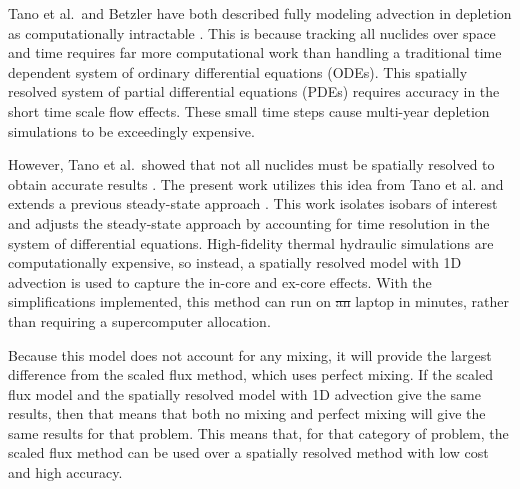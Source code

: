 \documentclass{style/nseJournal}
\providecommand{\DIFadd}[1]{{\protect\color{blue}\uwave{#1}}} %
\providecommand{\DIFdel}[1]{{\protect\color{red}\sout{#1}}}                      %
\providecommand{\DIFaddbegin}{} %
\providecommand{\DIFaddend}{} %
\providecommand{\DIFdelbegin}{} %
\providecommand{\DIFdelend}{} %
\begin{document}
Tano et al.\ and Betzler have both described fully modeling advection in depletion as computationally intractable \cite{tanocoupled2023, betzler_liquid-fueled_2021}.
This is because tracking all nuclides over space and time requires far more computational work than handling a traditional time dependent system of ordinary differential equations (ODEs).
This spatially resolved system of partial differential equations (PDEs) requires accuracy in the short time scale flow effects.
These small time steps cause multi-year depletion simulations to be exceedingly expensive.



However, Tano et al.\ showed that not all nuclides must be spatially resolved to obtain accurate results \cite{tanocoupled2023}.
The present work utilizes this idea from Tano et al. and extends a previous steady-state approach \cite{shahbazi_steady-state_2022}.
This work isolates isobars of interest and adjusts the steady-state approach by accounting for time resolution in the system of differential equations.
High-fidelity thermal hydraulic simulations are computationally expensive, so instead, a spatially resolved model with 1D advection is used to capture the in-core and ex-core effects.
With the simplifications implemented, this method can run on \DIFdelbegin \DIFdel{an }\DIFdelend \DIFaddbegin \DIFadd{a }\DIFaddend laptop in minutes, rather than requiring a supercomputer allocation.

Because this model does not account for any mixing, it will provide the largest difference from the scaled flux method, which uses perfect mixing.
If the scaled flux model and the spatially resolved model with 1D advection give the same results, then that means that both no mixing and perfect mixing will give the same results for that problem.
This means that, for that category of problem, the scaled flux method can be used over a spatially resolved method with low cost and high accuracy.
\end{document}
